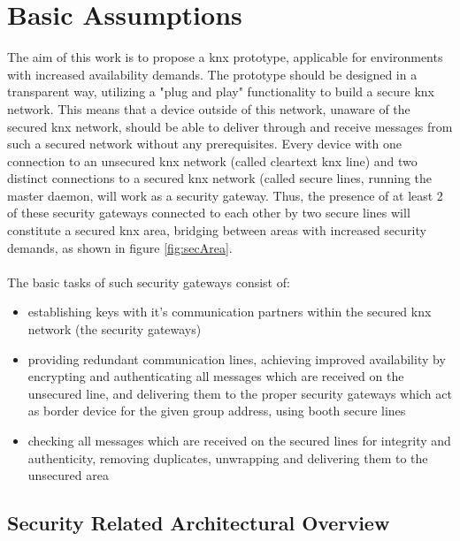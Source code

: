 \section{Basic Assumptions}

The aim of this work is to propose a \gls{knx} prototype, applicable for environments with increased availability demands.
The prototype should be designed in a transparent way, utilizing a "plug and play" functionality to build a secure \gls{knx} network.
This means that a device outside of this network, unaware of
the secured \gls{knx} network, should be able to deliver through and receive messages from such a secured network without any prerequisites. 
Every device with one connection to an unsecured \gls{knx} network (called cleartext \gls{knx} line) and two distinct connections to a secured \gls{knx}
network (called secure lines, running the master daemon, will work
as a security gateway. Thus, the presence of at least 2 of these security gateways connected to each other by two secure lines will constitute a 
secured \gls{knx} area, bridging between areas with increased security demands, as shown in figure \ref{fig:secArea}.
\\
\\
The basic tasks of such security gateways consist of:
\begin{itemize}
 \item establishing keys with it's communication partners within the secured \gls{knx} network (the security gateways)
 \item providing redundant communication lines, achieving improved availability by encrypting and authenticating all messages which are received on the unsecured line, and delivering them to the proper security gateways which act as
 border device for the given group address, using booth secure lines
 \item checking all messages which are received on the secured lines for integrity and authenticity, removing duplicates, unwrapping and delivering them to
 the unsecured area
\end{itemize}

\subsection{Security Related Architectural Overview}

